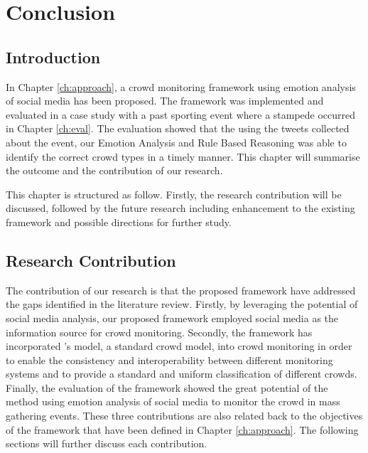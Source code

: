 \chapter{Conclusion}
\label{ch:conclusion}
\ifpdf
    \graphicspath{{Chapter6/Figs/Raster/}{Chapter6/Figs/PDF/}{Chapter6/Figs/}}
\else
    \graphicspath{{Chapter6/Figs/Vector/}{Chapter6/Figs/}}
\fi

\section{Introduction}

In Chapter \ref{ch:approach}, a crowd monitoring framework using emotion analysis of social media has been proposed. The framework was implemented and evaluated in a case study with a past sporting event where a stampede occurred in Chapter \ref{ch:eval}. The evaluation showed that the using the tweets collected about the event, our Emotion Analysis and Rule Based Reasoning was able to identify the correct crowd types in a timely manner. This chapter will summarise the outcome and the contribution of our research.

This chapter is structured as follow. Firstly, the research contribution will be discussed, followed by the future research including enhancement to the existing framework and possible directions for further study.

\section{Research Contribution}
The contribution of our research is that the proposed framework have addressed the gaps identified in the literature review. Firstly, by leveraging the potential of social media analysis, our proposed framework employed social media as the information source for crowd monitoring. Secondly, the framework has incorporated \textcite{Berlonghi1995}'s model, a standard crowd model, into crowd monitoring in order to enable the consistency and interoperability between different monitoring systems and to provide a standard and uniform classification of different crowds. Finally, the evaluation of the framework showed the great potential of the method using emotion analysis of social media to monitor the crowd in mass gathering events. These three contributions are also related back to the objectives of the framework that have been defined in Chapter \ref{ch:approach}. The following sections will further discuss each contribution.

